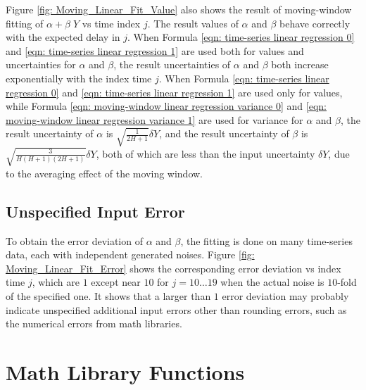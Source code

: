 \documentclass[twoside]{article}
\numberwithin{equation}{section}
\begin{document}
Figure \ref{fig: Moving_Linear_Fit_Value} also shows the result of moving-window fitting of $\alpha + \beta\; Y$ vs time index $j$.
The result values of $\alpha$ and $\beta$ behave correctly with the expected delay in $j$.
When Formula \eqref{eqn: time-series linear regression 0} and \eqref{eqn: time-series linear regression 1} are used both for values and uncertainties for $\alpha$ and $\beta$, the result uncertainties of $\alpha$ and $\beta$ both increase exponentially with the index time $j$.
When Formula \eqref{eqn: time-series linear regression 0} and \eqref{eqn: time-series linear regression 1} are used only for values, while Formula \eqref{eqn: moving-window linear regression variance 0} and \eqref{eqn: moving-window linear regression variance 1} are used for variance for $\alpha$ and $\beta$, the result uncertainty of $\alpha$ is $\sqrt{\frac{1}{2H+1}} \delta Y$, and the  result uncertainty of $\beta$ is $\sqrt{\frac{3}{H (H+1)(2H+1)}} \delta Y$, both of which are less than the input uncertainty $\delta Y$, due to the averaging effect of the moving window.


\subsection{Unspecified Input Error}

To obtain the error deviation of $\alpha$ and $\beta$, the fitting is done on many time-series data, each with independent generated noises.
Figure \ref{fig: Moving_Linear_Fit_Error} shows the corresponding error deviation vs index time $j$, which are $1$ except near $10$ for $j = 10 \dots 19$ when the actual noise is $10$-fold of the specified one.
It shows that a larger than $1$ error deviation may probably indicate unspecified additional input errors other than rounding errors, such as the numerical errors from math libraries.




  


\clearpage
\section{Math Library Functions}
\label{sec: Math Library}
\end{document}
